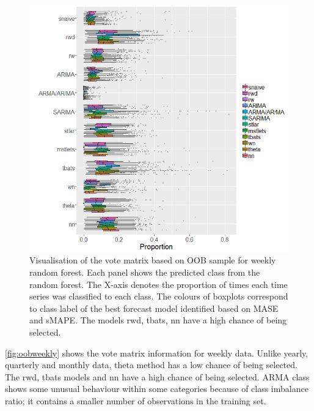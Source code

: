\documentclass[11pt,a4paper,]{article}
\begin{document}
\begin{figure}
\centering
\includegraphics{figures/oobweekly-1.png}
\caption{\label{fig:oobweekly}Visualisation of the vote matrix based on OOB sample for weekly random forest. Each panel shows the predicted class from the random forest. The X-axis denotes the proportion of times each time series was classified to each class. The colours of boxplots correspond to class label of the best forecast model identified based on MASE and sMAPE. The models rwd, tbats, nn have a high chance of being selected.}
\end{figure}

\autoref{fig:oobweekly} shows the vote matrix information for weekly data. Unlike yearly, quarterly and monthly data, theta method has a low chance of being selected. The rwd, tbats models and nn have a high chance of being selected. ARMA class shows some unusual behaviour within some categories because of class imbalance ratio; it contains a smaller number of observations in the training set.
\end{document}
